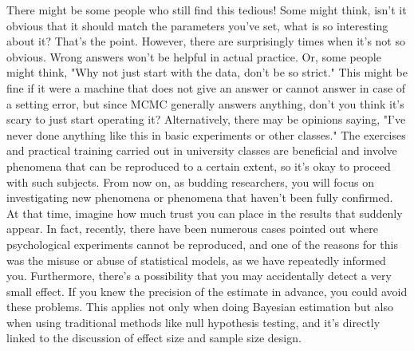 \documentclass{ltjsbook}
\begin{document}
There might be some people who still find this tedious! Some might think, isn't it obvious that it should match the parameters you've set, what is so interesting about it? That's the point. However, there are surprisingly times when it's not so obvious. Wrong answers won't be helpful in actual practice.
Or, some people might think, "Why not just start with the data, don't be so strict." This might be fine if it were a machine that does not give an answer or cannot answer in case of a setting error, but since MCMC generally answers anything, don't you think it's scary to just start operating it?
Alternatively, there may be opinions saying, "I've never done anything like this in basic experiments or other classes." The exercises and practical training carried out in university classes are beneficial and involve phenomena that can be reproduced to a certain extent, so it's okay to proceed with such subjects. From now on, as budding researchers, you will focus on investigating new phenomena or phenomena that haven’t been fully confirmed. At that time, imagine how much trust you can place in the results that suddenly appear. In fact, recently, there have been numerous cases pointed out where psychological experiments cannot be reproduced, and one of the reasons for this was the misuse or abuse of statistical models, as we have repeatedly informed you. Furthermore, there's a possibility that you may accidentally detect a very small effect. If you knew the precision of the estimate in advance, you could avoid these problems. This applies not only when doing Bayesian estimation but also when using traditional methods like null hypothesis testing, and it's directly linked to the discussion of effect size and sample size design.
\end{document}

